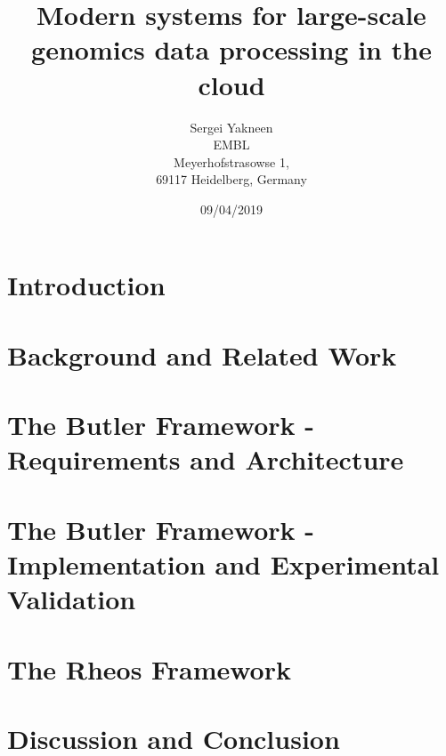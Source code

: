 \documentclass[12pt, twoside]{report}
\title{
	{Modern systems for large-scale genomics data processing in the cloud}\\
}
\author{Sergei Yakneen\\ EMBL\\ Meyerhofstrasowse 1,\\ 69117 Heidelberg, Germany}
\date{09/04/2019}
\begin{document}
\maketitle

\tableofcontents

\chapter{Introduction} \label{ch:introduction}


\chapter{Background and Related Work} \label{ch:background}

	 
\chapter{The Butler Framework - Requirements and Architecture} \label{ch:butler_architecture}


\chapter{The Butler Framework - Implementation and Experimental Validation} \label{ch:butler_implementation}


\chapter{The Rheos Framework} \label{ch:rheos_framework}


\chapter{Discussion and Conclusion} \label{ch:conclusion}


\label{ch:appendices}


\printbibliography
\end{document}
